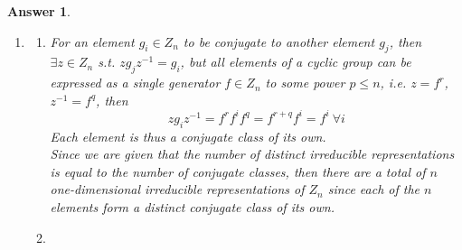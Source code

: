 \documentclass[a4paper]{article}
\DeclareMathOperator{\Id}{Id}
\newtheorem{ans}{Answer}[section]
\theoremstyle{new}
\begin{document}
\begin{ans}
\begin{enumerate}[label=(\roman*)]
\begin{enumerate}[label=(\alph*)]
\begin{itemize}
    $$\begin{pmatrix}0&0&0&1\\0&0&1&0\\0&1&0&0\\1&0&0&0\\\end{pmatrix}\begin{pmatrix}0&0&1&0\\0&0&0&1\\1&0&0&0\\0&1&0&0\\\end{pmatrix}=\begin{pmatrix}0&1&0&0\\1&0&0&0\\0&0&0&1\\0&0&1&0\\\end{pmatrix}$$
    \item Associativity: matrix multiplication is associative;
    \item Identity: $I_{4\times 4}$;
    \item Inverse: Each matrix is its own inverse.
\end{itemize}
The faithful representation of $D_2$ is $\{\Id,r,s,rs\}$ since each of the 3 non-identity matrix can be mapped bijectively to $r$, $s$ and $rs$.
\item By inspection, the invariant subspace is $(1,1,1,1)^T$ since the matrix are formed by permutating the rows/columns of the identity. Hence, $\exists$ a similarity transformation which will put all four matrix into the form $1\oplus A_{3\times 3}$.
\end{enumerate}
\item 
\begin{enumerate}[label=(\alph*)]
\item 
For an element $g_i\in Z_n$ to be conjugate to another element $g_j$, then $\exists z\in Z_n$ s.t. $zg_jz^{-1}=g_i$, but all elements of a cyclic group can be expressed as a single generator $f\in Z_n$ to some power $p\leq n$, i.e. $z=f^r$, $z^{-1}=f^q$, then
$$zg_iz^{-1}=f^rf^if^q=f^{r+q}f^i=f^i~\forall i$$
Each element is thus a conjugate class of its own.\\[5pt]
Since we are given that the number of distinct irreducible representations is equal to the number of conjugate classes, then there are a total of $n$ one-dimensional irreducible representations of $Z_n$ since each of the $n$ elements form a distinct conjugate class of its own.
\item 

\end{enumerate}
\end{enumerate}
\end{ans}
\end{document}
